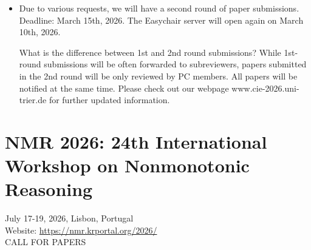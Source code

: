 \documentclass[prodmode,acmtecs]{acmsmall} %
\begin{document}
\begin{itemize}\item  Due to various requests, we will have a second round of paper submissions. Deadline: March 15th, 2026. The Easychair server will open again on March 10th, 2026. 
 
  What is the difference between 1st and 2nd round submissions? While 1st-round submissions will be often forwarded to subreviewers, papers submitted in the 2nd round will be only reviewed by PC members. All papers will be notified at the same time. Please check out our webpage www.cie-2026.uni-trier.de for further updated information. 
 
\end{itemize}\section{NMR 2026: 24th International Workshop on Nonmonotonic Reasoning}\label{NMR2026}  July 17-19, 2026, Lisbon, Portugal\\ 
  Website: \href{https://nmr.krportal.org/2026/}{https://nmr.krportal.org/2026/}\\ 
CALL FOR PAPERS 
\end{document}

